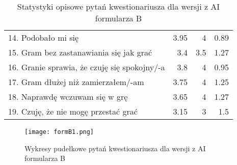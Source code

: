 \begin{table}[h!]
\begin{center}
\begin{tabular}{|m{10em}|r|r|r|}
            14. Podobało mi się                                               & 3.95          & 4       & 0.89           \\
            15. Gram bez zastanawiania się jak grać                           & 3.4           & 3.5     & 1.27           \\
            16. Granie sprawia, \newline że czuję się spokojny/-a             & 3.8           & 4       & 0.95           \\
            17. Gram dłużej \newline niż zamierzałem/-am                      & 3.75          & 4       & 1.25           \\
            18. Naprawdę wczuwam się w grę                                    & 3.65          & 4       & 1.27           \\
            19. Czuję, że nie mogę przestać grać                              & 3.15          & 3       & 1.5            \\
            \hline
        \end{tabular}
    \end{center}
    \caption{Statystyki opisowe pytań kwestionariusza dla wersji z AI formularza B}\label{tab1:ch7_7}
\end{table}

\begin{figure}[h!]
    \centering
    \texttt{[image: formB1.png]}
    \caption{Wykresy pudełkowe pytań kwestionariusza dla wersji z AI formularza B}
    \label{fig:ch7_formB1}
\end{figure} 

